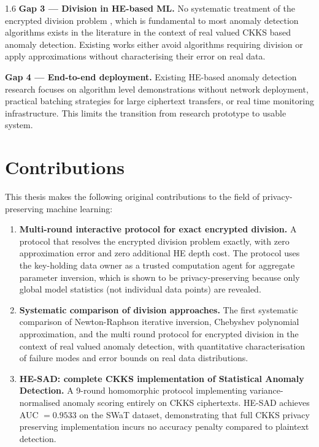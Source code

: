 \begin{spacing}{1.6}
\textbf{Gap 3 --- Division in HE-based ML.} No systematic treatment of the
encrypted division problem , which is fundamental to most anomaly detection
algorithms exists in the literature in the context of real valued CKKS based
anomaly detection. Existing works either avoid algorithms requiring division
or apply approximations without characterising their error on real data.

\textbf{Gap 4 --- End-to-end deployment.} Existing HE-based anomaly detection
research focuses on algorithm level demonstrations without network deployment,
practical batching strategies for large ciphertext transfers, or real time
monitoring infrastructure. This limits the transition from research prototype
to usable system.

\section{Contributions}

This thesis makes the following original contributions to the field of
privacy-preserving machine learning:

\begin{enumerate}
  \item \textbf{Multi-round interactive protocol for exact encrypted division.}
  A protocol that resolves the encrypted division problem exactly, with
  zero approximation error and zero additional HE depth cost. The protocol
  uses the key-holding data owner as a trusted computation agent for aggregate
  parameter inversion, which is shown to be privacy-preserving because only
  global model statistics (not individual data points) are revealed.

  \item \textbf{Systematic comparison of division approaches.}
  The first systematic comparison of Newton-Raphson iterative inversion,
  Chebyshev polynomial approximation, and the multi round protocol for encrypted
  division in the context of real valued anomaly detection, with quantitative
  characterisation of failure modes and error bounds on real data distributions.

  \item \textbf{HE-SAD: complete CKKS implementation of Statistical Anomaly
  Detection.} A 9-round homomorphic protocol implementing variance-normalised
  anomaly scoring entirely on CKKS ciphertexts. HE-SAD achieves AUC $= 0.9533$
  on the SWaT dataset, demonstrating that full CKKS privacy preserving
  implementation incurs no accuracy penalty compared to plaintext detection.


\end{enumerate}
\end{spacing}
